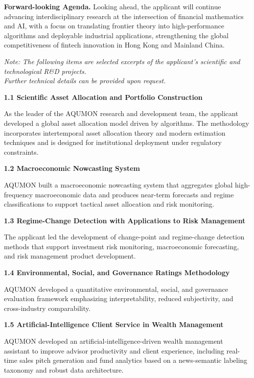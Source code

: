 \documentclass[11pt]{article}
\newcommand{\CVSubsection}[1]{\textbf{#1}\par}
\begin{document}
\textbf{Forward-looking Agenda.}
Looking ahead, the applicant will continue advancing interdisciplinary research at the intersection of financial mathematics and AI, with a focus on translating frontier theory into high-performance algorithms and deployable industrial applications, strengthening the global competitiveness of fintech innovation in Hong Kong and Mainland China.


\noindent\textit{Note: The following items are selected excerpts of the applicant’s scientific and technological R\&D projects.}\\
\noindent\textit{Further technical details can be provided upon request.}

\vspace{0.6em}

\CVSubsection{1.1 Scientific Asset Allocation and Portfolio Construction}

As the leader of the AQUMON research and development team, the applicant developed a global asset allocation model driven by algorithms. The methodology incorporates intertemporal asset allocation theory and modern estimation techniques and is designed for institutional deployment under regulatory constraints.

\CVSubsection{1.2 Macroeconomic Nowcasting System}

AQUMON built a macroeconomic nowcasting system that aggregates global high-frequency macroeconomic data and produces near-term forecasts and regime classifications to support tactical asset allocation and risk monitoring.

\CVSubsection{1.3 Regime-Change Detection with Applications to Risk Management}

The applicant led the development of change-point and regime-change detection methods that support investment risk monitoring, macroeconomic forecasting, and risk management product development.

\CVSubsection{1.4 Environmental, Social, and Governance Ratings Methodology}

AQUMON developed a quantitative environmental, social, and governance evaluation framework emphasizing interpretability, reduced subjectivity, and cross-industry comparability.

\CVSubsection{1.5 Artificial-Intelligence Client Service in Wealth Management}

AQUMON developed an artificial-intelligence-driven wealth management assistant to improve advisor productivity and client experience, including real-time sales pitch generation and fund analytics based on a news-semantic labeling taxonomy and robust data architecture.
\end{document}
